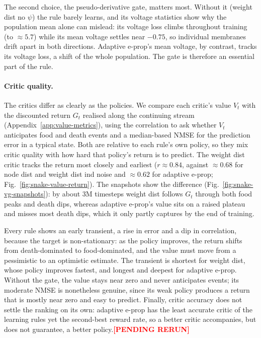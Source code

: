 \documentclass[10pt,twocolumn]{article}
\newcommand{\pending}[1]{\textcolor{red}{\bfseries[PENDING RERUN#1]}}
\newcommand{\variant}[1]{\textsf{#1}} %
\begin{document}
The second choice, the pseudo-derivative gate, matters most. Without it
(\variant{weight dist no $\psi$}) the rule barely learns, and its voltage
statistics show why the population mean alone can mislead: its voltage loss
climbs throughout training (to $\approx 5.7$) while its mean voltage settles
near $-0.75$, so individual membranes drift apart in both directions. Adaptive
e-prop's mean voltage, by contrast, tracks its voltage loss, a shift of the
whole population. The gate is therefore an essential part of the rule.

\paragraph{Critic quality.}
The critics differ as clearly as the policies. We compare each critic's value
$V_t$ with the discounted return $G_t$ realised along the continuing stream
(Appendix~\ref{app:value-metrics}), using the correlation to ask whether $V_t$
anticipates food and death events and a median-based NMSE for the prediction
error in a typical state. Both are relative to each rule's own policy, so they
mix critic quality with how hard that policy's return is to predict. The
\variant{weight dist} critic tracks the return most closely and earliest
($r\approx 0.84$, against $\approx 0.68$ for \variant{node dist} and
\variant{weight dist ind noise} and $\approx 0.62$ for adaptive e-prop;
Fig.~\ref{fig:snake-value-return}). The snapshots show the difference
(Fig.~\ref{fig:snake-vg-snapshots}): by about 3M timesteps \variant{weight dist}
follows $G_t$ through both food peaks and death dips, whereas adaptive e-prop's
value sits on a raised plateau and misses most death dips, which it only partly
captures by the end of training.

Every rule shows an early transient, a rise in error and a dip in correlation,
because the target is non-stationary: as the policy improves, the return shifts
from death-dominated to food-dominated, and the value must move from a
pessimistic to an optimistic estimate. The transient is shortest for
\variant{weight dist}, whose policy improves fastest, and longest and deepest
for adaptive e-prop. Without the gate, the value stays near zero and never
anticipates events; its moderate NMSE is nonetheless genuine, since its weak
policy produces a return that is mostly near zero and easy to predict. Finally,
critic accuracy does not settle the ranking on its own: adaptive e-prop has the
least accurate critic of the learning rules yet the second-best reward rate, so
a better critic accompanies, but does not guarantee, a better
policy.\pending{}
\end{document}
